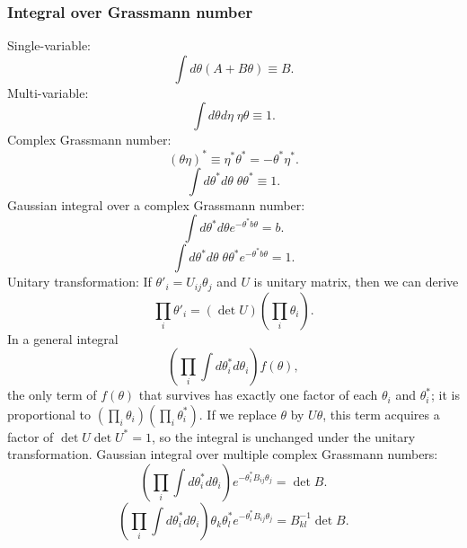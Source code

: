 \subsubsection{Integral over Grassmann number}
\noindent
Single-variable:
\[\int d\theta (A + B\theta) \equiv B.\]
Multi-variable:
\[\int d\theta d\eta \; \eta \theta \equiv 1.\]
Complex Grassmann number:
\[(\theta \eta)^* \equiv \eta^* \theta^* = -\theta^* \eta^*.\]
\[\int d\theta^* d\theta \; \theta \theta^* \equiv 1.\]
Gaussian integral over a complex Grassmann number:
\[\int d\theta^* d\theta e^{-\theta^* b \theta} = b.\]
\[\int d\theta^* d\theta \; \theta \theta^* e^{-\theta^* b \theta}  = 1.\]
Unitary transformation:
If $\theta'_i = U_{ij}\theta_j$ and $U$ is unitary matrix, then we can derive
\[\prod_i \theta'_i = (\det U) (\prod_i \theta_i).\]
In a general integral
\[(\prod_i \int d\theta^*_i d\theta_i) f(\theta),\]
the only term of $f(\theta)$ that survives has exactly one factor of each $\theta_i$ and $\theta^*_i$; it is proportional to $(\prod_i \theta_i)(\prod_i \theta^*_i)$. If we replace $\theta$ by $U\theta$, this term acquires a factor of $\det U \det U^* = 1$, so the integral is unchanged under the unitary transformation.
Gaussian integral over multiple complex Grassmann numbers:
\[(\prod_i \int d\theta^*_i d\theta_i) e^{-\theta^*_i B_{ij}\theta_j} = \det B.\]
\[(\prod_i \int d\theta^*_i d\theta_i) \theta_k \theta^*_l e^{-\theta^*_i B_{ij}\theta_j} =B^{-1}_{kl} \det B.\]

